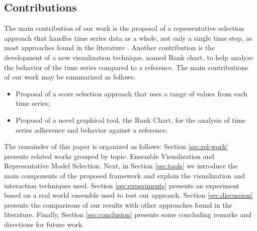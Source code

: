 \documentclass[final,5p,times,twocolumn]{elsarticle}
\begin{document}
\subsection{Contributions}
The main contribution of our work is the proposal of a representative selection approach that handles time series data as a whole, not only a single time step, as most approaches found in the literature \cite{selection-sarma:2013, meira:2016}. Another contribution is the development of a new visualization technique, named Rank chart, to help analyze the behavior of the time series compared to a reference. The main contributions of our work may be summarized as follows:


\begin{itemize}
  \item Proposal of a score selection approach that uses a range of values from each time series;
  \item Proposal of a novel graphical tool, the Rank Chart, for the analysis of time series adherence and behavior against a reference;
\end{itemize}

The remainder of this paper is organized as follows: Section \ref{sec:rel-work} presents related works grouped by topic: Ensemble Visualization and Representative Model Selection. Next, in Section \ref{sec:tools} we introduce the main components of the proposed framework and explain the visualization and interaction techniques used. Section \ref{sec:experiments} presents an experiment based on a real world ensemble used to test our approach. Section \ref{sec:discussion} presents the comparisons of our results with other approaches found in the literature. Finally, Section \ref{sec:conclusion} presents some concluding remarks and directions for future work.
\end{document}
